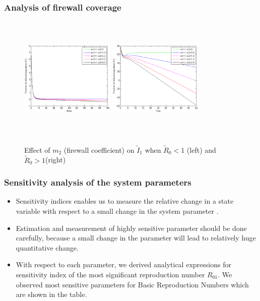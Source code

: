 \documentclass{beamer}
\begin{document}
\begin{frame}\frametitle{Analysis of firewall coverage}
\begin{figure}
  \centering
  \subfloat \label{fig:e}{\includegraphics[height=6cm,width=4.5cm]{13-DR11}}\qquad
  \subfloat \label{fig:f}{\includegraphics[height=6cm,width=4.5cm]{13-DR12}}
\caption{ Effect of $m_2$ (firewall coefficient) on $ \tilde I_1$ when $\tilde R_0 < 1$ (left) and $\tilde R_0 > 1$(right)}
\label{fig:2b}
\end{figure}

\end{frame}


\begin{frame}\frametitle{Sensitivity analysis of the system parameters}
\begin{itemize}
\item Sensitivity indices enables us
to measure the relative change in a state variable with respect to a
small change in the system parameter \cite{edtr14}.
\item Estimation and measurement of highly sensitive parameter should
be done carefully, because a small change in the parameter will lead to
relatively huge quantitative change.
\item With respect to each parameter, we derived analytical expressions
for sensitivity index of the most significant reproduction number $R_{01}$. We observed most sensitive parameters for
Basic Reproduction Numbers which are shown in the table.
\end{itemize}
\end{frame}
\end{document}
